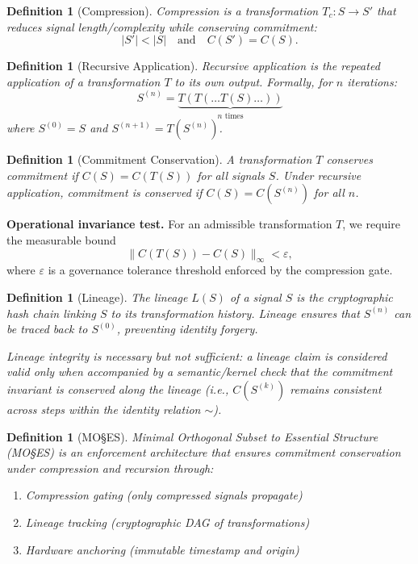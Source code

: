 \documentclass[11pt,a4paper]{article}
\newtheorem{definition}[theorem]{Definition}
\begin{document}
\begin{definition}[Compression]
Compression is a transformation $T_c: S \rightarrow S'$ that reduces signal length/complexity while conserving commitment:
\begin{equation}
|S'| < |S| \quad \text{and} \quad C(S') = C(S).
\end{equation}
\end{definition}

\begin{definition}[Recursive Application]
Recursive application is the repeated application of a transformation $T$ to its own output. Formally, for $n$ iterations:
\begin{equation}
S^{(n)} = \underbrace{T(T(\ldots T(S)\ldots))}_{n \text{ times}}
\end{equation}
where $S^{(0)} = S$ and $S^{(n+1)} = T(S^{(n)})$.
\end{definition}

\begin{definition}[Commitment Conservation]
A transformation $T$ conserves commitment if $C(S) = C(T(S))$ for all signals $S$. Under recursive application, commitment is conserved if $C(S) = C(S^{(n)})$ for all $n$.
\end{definition}

\noindent\textbf{Operational invariance test.} For an admissible transformation $T$, we require the measurable bound
\begin{equation}
\| C(T(S)) - C(S) \|_\infty < \varepsilon,
\end{equation}
where $\varepsilon$ is a governance tolerance threshold enforced by the compression gate.

\begin{definition}[Lineage]
The lineage $L(S)$ of a signal $S$ is the cryptographic hash chain linking $S$ to its transformation history. Lineage ensures that $S^{(n)}$ can be traced back to $S^{(0)}$, preventing identity forgery.

Lineage integrity is necessary but not sufficient: a lineage claim is considered valid only when accompanied by a semantic/kernel check that the commitment invariant is conserved along the lineage (i.e., $C(S^{(k)})$ remains consistent across steps within the identity relation $\sim$).
\end{definition}

\begin{definition}[MO\S{}ES\texttrademark{}]
Minimal Orthogonal Subset to Essential Structure (MO\S{}ES\texttrademark{}) is an enforcement architecture that ensures commitment conservation under compression and recursion through:
\begin{enumerate}
    \item Compression gating (only compressed signals propagate)
    \item Lineage tracking (cryptographic DAG of transformations)
    \item Hardware anchoring (immutable timestamp and origin)
\end{enumerate}
\end{definition}
\end{document}
